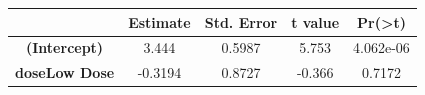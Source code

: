\documentclass[]{article}
\begin{document}
\begin{longtable}[]{@{}ccccc@{}}
\toprule
\begin{minipage}[b]{0.24\columnwidth}\centering\strut
~\strut
\end{minipage} & \begin{minipage}[b]{0.13\columnwidth}\centering\strut
Estimate\strut
\end{minipage} & \begin{minipage}[b]{0.16\columnwidth}\centering\strut
Std. Error\strut
\end{minipage} & \begin{minipage}[b]{0.12\columnwidth}\centering\strut
t value\strut
\end{minipage} & \begin{minipage}[b]{0.13\columnwidth}\centering\strut
Pr(\textgreater{}\textbar{}t\textbar{})\strut
\end{minipage}\tabularnewline
\midrule
\endhead
\begin{minipage}[t]{0.24\columnwidth}\centering\strut
\textbf{(Intercept)}\strut
\end{minipage} & \begin{minipage}[t]{0.13\columnwidth}\centering\strut
3.444\strut
\end{minipage} & \begin{minipage}[t]{0.16\columnwidth}\centering\strut
0.5987\strut
\end{minipage} & \begin{minipage}[t]{0.12\columnwidth}\centering\strut
5.753\strut
\end{minipage} & \begin{minipage}[t]{0.13\columnwidth}\centering\strut
4.062e-06\strut
\end{minipage}\tabularnewline
\begin{minipage}[t]{0.24\columnwidth}\centering\strut
\textbf{doseLow Dose}\strut
\end{minipage} & \begin{minipage}[t]{0.13\columnwidth}\centering\strut
-0.3194\strut
\end{minipage} & \begin{minipage}[t]{0.16\columnwidth}\centering\strut
0.8727\strut
\end{minipage} & \begin{minipage}[t]{0.12\columnwidth}\centering\strut
-0.366\strut
\end{minipage} & \begin{minipage}[t]{0.13\columnwidth}\centering\strut
0.7172\strut
\end{minipage}\tabularnewline

\end{longtable}
\end{document}
